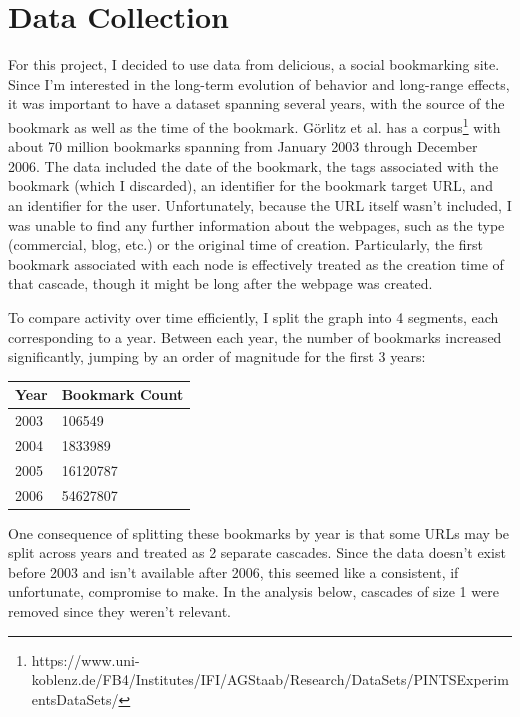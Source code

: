 \documentclass[11pt]{amsart}
\begin{document}
\section{Data Collection}
For this project, I decided to use data from delicious, a social bookmarking site. Since I'm interested in the long-term evolution of behavior and long-range effects, it was important to have a dataset spanning several years, with the source of the bookmark as well as the time of the bookmark. G\"orlitz et al. \cite{goerlitz} has a corpus\footnote[1]{https://www.uni-koblenz.de/FB4/Institutes/IFI/AGStaab/Research/DataSets/PINTSExperimentsDataSets/} with about 70 million bookmarks spanning from January 2003 through December 2006. The data included the date of the bookmark, the tags associated with the bookmark (which I discarded), an identifier for the bookmark target URL, and an identifier for the user. Unfortunately, because the URL itself wasn't included, I was unable to find any further information about the webpages, such as the type (commercial, blog, etc.) or the original time of creation. Particularly, the first bookmark associated with each node is effectively treated as the creation time of that cascade, though it might be long after the webpage was created.

To compare activity over time efficiently, I split the graph into 4 segments, each corresponding to a year. Between each year, the number of bookmarks increased significantly, jumping by an order of magnitude for the first 3 years:

\vspace{10pt}

\begin{tabular}{| l | l |}
 \hline
Year & Bookmark Count \\ \hline
2003 & 106549\\ \hline
2004 & 1833989 \\ \hline
2005 & 16120787 \\ \hline
2006 & 54627807 \\ \hline
\end{tabular}

\vspace{10pt}

One consequence of splitting these bookmarks by year is that some URLs may be split across years and treated as 2 separate cascades. Since the data doesn't exist before 2003 and isn't available after 2006, this seemed like a consistent, if unfortunate, compromise to make. In the analysis below, cascades of size 1 were removed since they weren't relevant.
\end{document}
